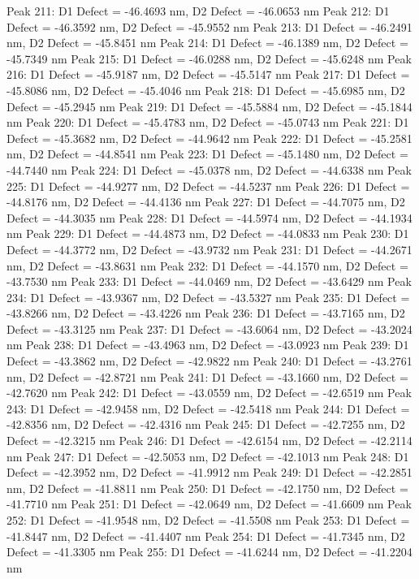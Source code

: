 \documentclass{article}
\begin{document}
Peak 211: D1 Defect = -46.4693 nm, D2 Defect = -46.0653 nm
Peak 212: D1 Defect = -46.3592 nm, D2 Defect = -45.9552 nm
Peak 213: D1 Defect = -46.2491 nm, D2 Defect = -45.8451 nm
Peak 214: D1 Defect = -46.1389 nm, D2 Defect = -45.7349 nm
Peak 215: D1 Defect = -46.0288 nm, D2 Defect = -45.6248 nm
Peak 216: D1 Defect = -45.9187 nm, D2 Defect = -45.5147 nm
Peak 217: D1 Defect = -45.8086 nm, D2 Defect = -45.4046 nm
Peak 218: D1 Defect = -45.6985 nm, D2 Defect = -45.2945 nm
Peak 219: D1 Defect = -45.5884 nm, D2 Defect = -45.1844 nm
Peak 220: D1 Defect = -45.4783 nm, D2 Defect = -45.0743 nm
Peak 221: D1 Defect = -45.3682 nm, D2 Defect = -44.9642 nm
Peak 222: D1 Defect = -45.2581 nm, D2 Defect = -44.8541 nm
Peak 223: D1 Defect = -45.1480 nm, D2 Defect = -44.7440 nm
Peak 224: D1 Defect = -45.0378 nm, D2 Defect = -44.6338 nm
Peak 225: D1 Defect = -44.9277 nm, D2 Defect = -44.5237 nm
Peak 226: D1 Defect = -44.8176 nm, D2 Defect = -44.4136 nm
Peak 227: D1 Defect = -44.7075 nm, D2 Defect = -44.3035 nm
Peak 228: D1 Defect = -44.5974 nm, D2 Defect = -44.1934 nm
Peak 229: D1 Defect = -44.4873 nm, D2 Defect = -44.0833 nm
Peak 230: D1 Defect = -44.3772 nm, D2 Defect = -43.9732 nm
Peak 231: D1 Defect = -44.2671 nm, D2 Defect = -43.8631 nm
Peak 232: D1 Defect = -44.1570 nm, D2 Defect = -43.7530 nm
Peak 233: D1 Defect = -44.0469 nm, D2 Defect = -43.6429 nm
Peak 234: D1 Defect = -43.9367 nm, D2 Defect = -43.5327 nm
Peak 235: D1 Defect = -43.8266 nm, D2 Defect = -43.4226 nm
Peak 236: D1 Defect = -43.7165 nm, D2 Defect = -43.3125 nm
Peak 237: D1 Defect = -43.6064 nm, D2 Defect = -43.2024 nm
Peak 238: D1 Defect = -43.4963 nm, D2 Defect = -43.0923 nm
Peak 239: D1 Defect = -43.3862 nm, D2 Defect = -42.9822 nm
Peak 240: D1 Defect = -43.2761 nm, D2 Defect = -42.8721 nm
Peak 241: D1 Defect = -43.1660 nm, D2 Defect = -42.7620 nm
Peak 242: D1 Defect = -43.0559 nm, D2 Defect = -42.6519 nm
Peak 243: D1 Defect = -42.9458 nm, D2 Defect = -42.5418 nm
Peak 244: D1 Defect = -42.8356 nm, D2 Defect = -42.4316 nm
Peak 245: D1 Defect = -42.7255 nm, D2 Defect = -42.3215 nm
Peak 246: D1 Defect = -42.6154 nm, D2 Defect = -42.2114 nm
Peak 247: D1 Defect = -42.5053 nm, D2 Defect = -42.1013 nm
Peak 248: D1 Defect = -42.3952 nm, D2 Defect = -41.9912 nm
Peak 249: D1 Defect = -42.2851 nm, D2 Defect = -41.8811 nm
Peak 250: D1 Defect = -42.1750 nm, D2 Defect = -41.7710 nm
Peak 251: D1 Defect = -42.0649 nm, D2 Defect = -41.6609 nm
Peak 252: D1 Defect = -41.9548 nm, D2 Defect = -41.5508 nm
Peak 253: D1 Defect = -41.8447 nm, D2 Defect = -41.4407 nm
Peak 254: D1 Defect = -41.7345 nm, D2 Defect = -41.3305 nm
Peak 255: D1 Defect = -41.6244 nm, D2 Defect = -41.2204 nm
\end{document}
